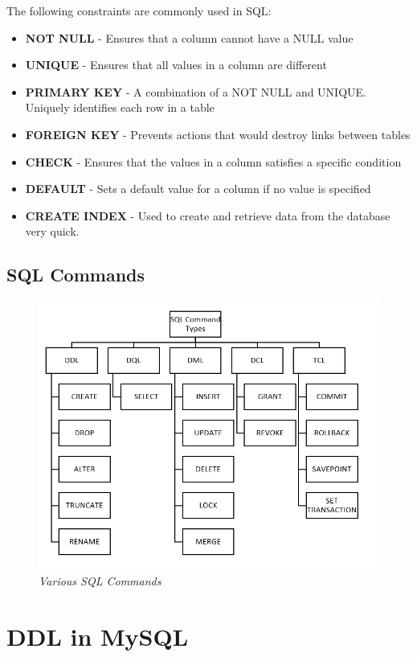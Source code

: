 The following constraints are commonly used in SQL:
\begin{itemize}
	\tightlist
	\item \textbf{NOT NULL} - Ensures that a column cannot have a NULL value
	\item \textbf{UNIQUE} - Ensures that all values in a column are different
	\item \textbf{PRIMARY KEY} - A combination of a NOT NULL and UNIQUE. Uniquely identifies each row in a table
	\item \textbf{FOREIGN KEY} - Prevents actions that would destroy links between tables
	\item \textbf{CHECK} - Ensures that the values in a column satisfies a specific condition
	\item \textbf{DEFAULT} - Sets a default value for a column if no value is specified
	\item \textbf{CREATE INDEX} - Used to create and retrieve data from the database very quick.
\end{itemize}

\section{SQL Commands}
\begin{figure}[h]
	\centering
	\includegraphics[width=0.85\linewidth]{img/a1}
	\caption{\textit{Various SQL Commands}}
	\label{fig:sql_commands}
\end{figure}


\chapter{DDL in MySQL}
